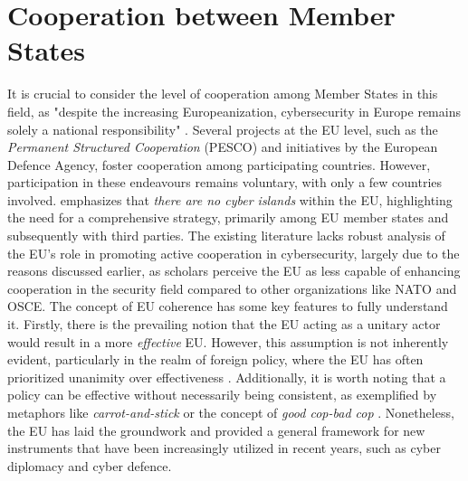 \section{Cooperation between Member States}

It is crucial to consider the level of cooperation among Member States in this field, as "despite the increasing Europeanization, cybersecurity in Europe remains solely a national responsibility" \autocite[13]{renard_2014_european}. Several projects at the EU level, such as the \textit{Permanent Structured Cooperation} (PESCO) and initiatives by the European Defence Agency, foster cooperation among participating countries. However, participation in these endeavours remains voluntary, with only a few countries involved. \textcite{kasper_2021_the} emphasizes that \textit{there are no cyber islands} within the EU, highlighting the need for a comprehensive strategy, primarily among EU member states and subsequently with third parties.  The existing literature lacks robust analysis of the EU's role in promoting active cooperation in cybersecurity, largely due to the reasons discussed earlier, as scholars perceive the EU as less capable of enhancing cooperation in the security field compared to other organizations like NATO and OSCE. The concept of EU coherence has some key features to fully understand it. Firstly, there is the prevailing notion that the EU acting as a unitary actor would result in a more \textit{effective} EU. However, this assumption is not inherently evident, particularly in the realm of foreign policy, where the EU has often prioritized unanimity over effectiveness \autocite[5]{missiroli_2001_occasional}. Additionally, it is worth noting that a policy can be effective without necessarily being consistent, as exemplified by metaphors like \textit{carrot-and-stick} or the concept of \textit{good cop-bad cop} \autocite[5]{missiroli_2001_occasional}. Nonetheless, the EU has laid the groundwork and provided a general framework for new instruments that have been increasingly utilized in recent years, such as cyber diplomacy and cyber defence.

